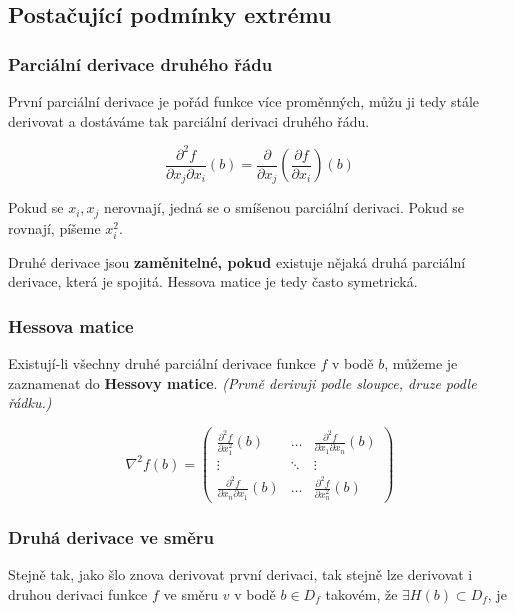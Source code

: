 \subsection{Postačující podmínky extrému}

\subsubsection{Parciální derivace druhého řádu}

První parciální derivace je pořád funkce více proměnných, můžu ji tedy stále derivovat a dostáváme tak parciální derivaci druhého řádu.

\begin{equation}
    \frac{\partial^2 f}{\partial x_j \partial x_i}(b) = \frac{\partial}{\partial x_j} \left(\frac{\partial f}{\partial x_i}\right)(b)
\end{equation}

Pokud se $x_i, x_j$ nerovnají, jedná se o smíšenou parciální derivaci. Pokud se rovnají, píšeme $x_i^2$.

Druhé derivace jsou \textbf{zaměnitelné, pokud} existuje nějaká druhá parciální derivace, která je spojitá. Hessova matice je tedy často symetrická.

\subsubsection{Hessova matice}

Existují-li všechny druhé parciální derivace funkce $f$ v bodě $b$, můžeme je zaznamenat do \textbf{Hessovy matice}. \textit{(Prvně derivuji podle sloupce, druze podle řádku.)}

\begin{equation}
    \nabla^2 f(b) = \begin{pmatrix}
\frac{\partial^2 f}{\partial x^2_1} (b) & \ldots & \frac{\partial^2 f}{\partial x_1 \partial x_n} (b)\\
\vdots & \ddots & \vdots \\
\frac{\partial^2 f}{\partial x_n \partial x_1} (b) & \ldots & \frac{\partial^2 f}{\partial x^2_n} (b)
\end{pmatrix}
\end{equation}

\subsubsection{Druhá derivace ve směru}

Stejně tak, jako šlo znova derivovat první derivaci, tak stejně lze derivovat i druhou derivaci funkce $f$ ve směru $v$ v bodě $b \in D_f$ takovém, že $\exists H(b) \subset D_f$, je

